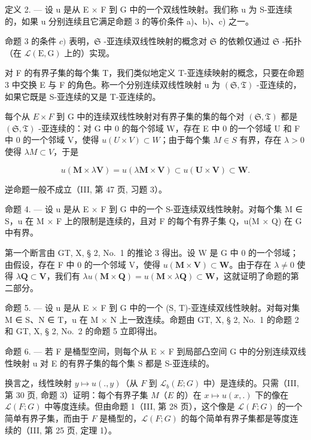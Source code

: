 定义 2. --- 设 u 是从 E × F 到 G 中的一个双线性映射。我们称 u 为 S-亚连续的，如果 u 分别连续且它满足命题 3 的等价条件 a)、b)、c) 之一。

命题 3 的条件 \(c)\) 表明，\(\mathfrak{S}\) -亚连续双线性映射的概念对 \(\mathfrak{S}\) 的依赖仅通过 \(\mathfrak{S}\) -拓扑（在 \(\mathcal{L}(\mathrm{E},\mathrm{G})\) 上的）实现。

对 F 的有界子集的每个集 T，我们类似地定义 T-亚连续映射的概念，只要在命题 3 中交换 E 与 F 的角色。称一个分别连续双线性映射 u 为 \((\mathfrak{S}, \mathfrak{T})\) -亚连续的，如果它既是 S-亚连续的又是 T-亚连续的。

每个从 \(E \times F\) 到 G 中的连续双线性映射对有界子集的集的每个对 \((\mathfrak{S}, \mathfrak{T})\) 都是 \((\mathfrak{S}, \mathfrak{T})\) -亚连续的：对 G 中 0 的每个邻域 W，存在 E 中 0 的一个邻域 U 和 F 中 0 的一个邻域 V，使得 \(u(U \times V) \subset W\)；由于每个集 \(M \in S\) 有界，存在 \(\lambda > 0\) 使得 \(\lambda M \subset V\)，于是

\[
u (\mathbf {M} \times \lambda \mathbf {V}) = u (\lambda \mathbf {M} \times \mathbf {V}) \subset u (\mathbf {U} \times \mathbf {V}) \subset \mathbf {W}.
\]

逆命题一般不成立（III, 第 47 页, 习题 3）。

命题 4. --- 设 u 是从 E × F 到 G 中的一个 S-亚连续双线性映射。对每个集 M ∈ S，u 在 M × F 上的限制是连续的，且对 F 的每个有界子集 Q，u(M × Q) 在 G 中有界。

第一个断言由 GT, X, § 2, No.~1 的推论 3 得出。设 W 是 G 中 0 的一个邻域；由假设，存在 F 中 0 的一个邻域 V，使得 \(u(\mathbf{M} \times \mathbf{V}) \subset \mathbf{W}\)。由于存在 \(\lambda \neq 0\) 使得 \(\lambda \mathbf{Q} \subset \mathbf{V}\)，我们有 \(\lambda u(\mathbf{M} \times \mathbf{Q}) = u(\mathbf{M} \times \lambda \mathbf{Q}) \subset \mathbf{W}\)，这就证明了命题的第二部分。

命题 5. --- 设 u 是从 E × F 到 G 中的一个 (S, T)-亚连续双线性映射。对每对集 M ∈ S、N ∈ T，u 在 M × N 上一致连续。命题由 GT, X, § 2, No.~1 的命题 2 和 GT, X, § 2, No.~2 的命题 5 立即得出。

命题 6. --- 若 F 是桶型空间，则每个从 E × F 到局部凸空间 G 中的分别连续双线性映射 u 对 E 的有界子集的每个集 S 都是 S-亚连续的。

换言之，线性映射 \(y \mapsto u(., y)\)（从 \(F\) 到 \(\mathcal{L}_b(E; G)\) 中）是连续的。只需（III, 第 30 页, 命题 3）证明：每个有界子集 \(M\)（\(E\) 的）在 \(x \mapsto u(x, .)\) 下的像在 \(\mathcal{L}(F; G)\) 中等度连续。但由命题 1（III, 第 28 页），这个像是 \(\mathcal{L}(F; G)\) 的一个简单有界子集，而由于 \(F\) 是桶型的，\(\mathcal{L}(F; G)\) 的每个简单有界子集都是等度连续的（III, 第 25 页, 定理 1）。

